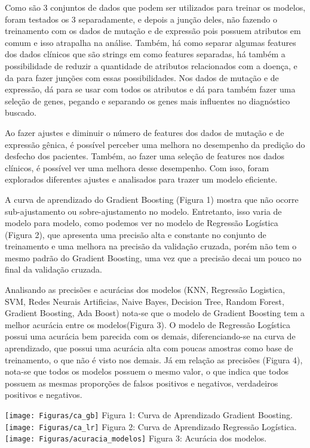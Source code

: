 \documentclass{article}
\begin{document}
\begin{multicols}{2}
Como são 3 conjuntos de dados que podem ser utilizados para treinar os modelos, foram testados os 3 separadamente, e depois a junção deles, não fazendo o treinamento com os dados de mutação e de expressão pois possuem atributos em comum e isso atrapalha na análise. Também, há como separar algumas features dos dados clínicos que são strings em como features separadas, há também a possibilidade de reduzir a quantidade de atributos relacionados com a doença, e da para fazer junções com essas possibilidades. Nos dados de mutação e de expressão, dá para se usar com todos os atributos e dá para também fazer uma seleção de genes, pegando e separando os genes mais influentes no diagnóstico buscado.

Ao fazer ajustes e diminuir o número de features dos dados de mutação e de expressão gênica, é possível perceber uma melhora no desempenho da predição  do desfecho dos pacientes. Também, ao fazer uma seleção de features nos dados clínicos, é possível ver uma melhora desse desempenho. Com isso, foram explorados diferentes ajustes e analisados para trazer um modelo eficiente.

A curva de aprendizado do Gradient Boosting (Figura 1) mostra que não ocorre sub-ajustamento ou sobre-ajustamento no modelo. Entretanto, isso varia de modelo para modelo, como podemos ver no modelo de Regressão Logística (Figura 2), que apresenta uma precisão alta e constante no conjunto de treinamento e uma melhora na precisão da validação cruzada, porém não tem o mesmo padrão do Gradient Boosting, uma vez que a precisão decai um pouco no final da validação cruzada.

Analisando as precisões e acurácias dos modelos (KNN, Regressão Logistica, SVM, Redes Neurais Artificias, Naive Bayes, Decision Tree, Random Forest, Gradient Boosting, Ada Boost) nota-se que o modelo de Gradient Boosting tem a melhor acurácia entre os modelos(Figura 3). O modelo de Regressão Logística possui uma acurácia bem parecida com os demais, diferenciando-se na curva de aprendizado, que possui uma acurácia alta com poucas amostras como base de treinamento, o que não é visto nos demais. Já em relação as precisões (Figura 4), nota-se que todos os modelos possuem o mesmo valor, o que indica que todos possuem as mesmas proporções de falsos positivos e negativos, verdadeiros positivos e negativos.
\begin{center}
    \texttt{[image: Figuras/ca\_gb]}
    Figura 1: Curva de Aprendizado Gradient Boosting.
    \texttt{[image: Figuras/ca\_lr]}
    Figura 2: Curva de Aprendizado Regressão Logística.
    \texttt{[image: Figuras/acuracia\_modelos]}
    Figura 3: Acurácia dos modelos.


\end{center}
\end{multicols}
\end{document}
